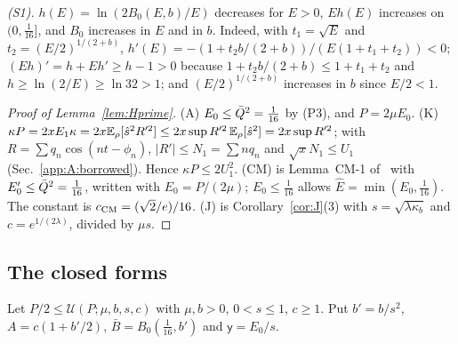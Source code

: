 \emph{(S1).} $h(E)=\ln(2B_0(E,b)/E)$ decreases for $E>0$, $Eh(E)$ increases on $(0,\frac1{16}]$, and $B_0$ increases in $E$ and in $b$.
Indeed, with $t_1=\sqrt E$ and $t_2=(E/2)^{1/(2+b)}$, $h'(E)=-(1+t_2b/(2+b))/(E(1+t_1+t_2))<0$; $(Eh)'=h+Eh'\ge h-1>0$ because $1+t_2b/(2+b)\le1+t_1+t_2$ and $h\ge\ln(2/E)\ge\ln32>1$; and $(E/2)^{1/(2+b)}$ increases in $b$ since $E/2<1$.

\begin{proof}[Proof of Lemma~\ref{lem:Hprime}]
(A) $E_0\le\bar Q^2=\frac1{16}$ by (P3), and $P=2\mu E_0$.
(K) $\kappa P=2xE_1\kappa=2x\mathbb{E}_\rho[\hat s^2R'^2]\le2x\sup R'^2\,\mathbb{E}_\rho[\hat s^2]=2x\sup R'^2$; with $R=\sum q_n\cos(nt-\phi_n)$, $|R'|\le N_1=\sum nq_n$ and $\sqrt xN_1\le U_1$ (Sec.~\ref{app:A:borrowed}). Hence $\kappa P\le2U_1^2$.
(CM) is Lemma~CM-1 of~\cite{H} with $E_0'\le\bar Q^2=\frac1{16}$, written with $E_0=P/(2\mu)$; $E_0\le\frac1{16}$ allows $\hat E=\min(E_0,\frac1{16})$. The constant is $c_{\rm CM}=(\sqrt2/e)/16$.
(J) is Corollary~\ref{cor:J}(3) with $s=\sqrt{\lambda\kappa_b}$ and $c=e^{1/(2\lambda)}$, divided by $\mu s$.
\end{proof}

\subsection{The closed forms}
\label{app:A:DI}

Let $P/2\le\mathcal U(P;\mu,b,s,c)$ with $\mu,b>0$, $0<s\le1$, $c\ge1$. Put $b'=b/s^2$, $A=c(1+b'/2)$, $\bar B=B_0(\frac1{16},b')$ and $\mathsf y=E_0/s$.

